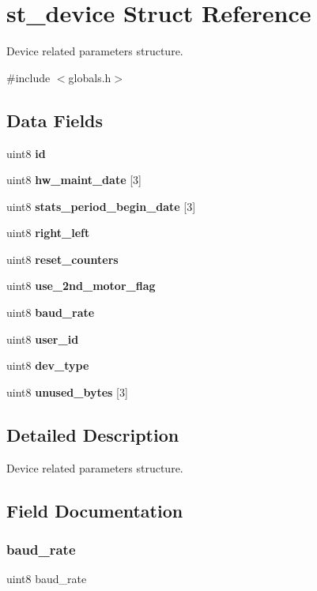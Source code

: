 \section{st\+\_\+device Struct Reference}
\label{structst__device}


Device related parameters structure.  




{\ttfamily \#include $<$globals.\+h$>$}

\subsection*{Data Fields}
\begin{DoxyCompactItemize}
\item 
uint8 \textbf{ id}
\item 
uint8 \textbf{ hw\+\_\+maint\+\_\+date} [3]
\item 
uint8 \textbf{ stats\+\_\+period\+\_\+begin\+\_\+date} [3]
\item 
uint8 \textbf{ right\+\_\+left}
\item 
uint8 \textbf{ reset\+\_\+counters}
\item 
uint8 \textbf{ use\+\_\+2nd\+\_\+motor\+\_\+flag}
\item 
uint8 \textbf{ baud\+\_\+rate}
\item 
uint8 \textbf{ user\+\_\+id}
\item 
uint8 \textbf{ dev\+\_\+type}
\item 
uint8 \textbf{ unused\+\_\+bytes} [3]
\end{DoxyCompactItemize}


\subsection{Detailed Description}
Device related parameters structure. 



\subsection{Field Documentation}
\mbox{\label{structst__device_a1a2b3002580421effeca67955a862580}} 
\subsubsection{baud\+\_\+rate}
{\footnotesize\ttfamily uint8 baud\+\_\+rate}

